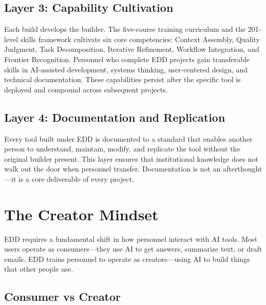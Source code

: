 \documentclass[11pt,letterpaper]{article}
\begin{document}
\subsection{Layer 3: Capability Cultivation}
\label{sec:layer-3}

Each build develops the builder. The five-course training curriculum and the 201-level
skills framework cultivate six core competencies: Context Assembly, Quality Judgment,
Task Decomposition, Iterative Refinement, Workflow Integration, and Frontier Recognition.
Personnel who complete EDD projects gain transferable skills in AI-assisted development,
systems thinking, user-centered design, and technical documentation. These capabilities
persist after the specific tool is deployed and compound across subsequent projects.

\subsection{Layer 4: Documentation and Replication}
\label{sec:layer-4}

Every tool built under EDD is documented to a standard that enables another person to
understand, maintain, modify, and replicate the tool without the original builder present.
This layer ensures that institutional knowledge does not walk out the door when personnel
transfer. Documentation is not an afterthought---it is a core deliverable of every project.

\section{The Creator Mindset}
\label{sec:creator-mindset}

EDD requires a fundamental shift in how personnel interact with AI tools. Most users
operate as consumers---they use AI to get answers, summarize text, or draft emails.
EDD trains personnel to operate as creators---using AI to build things that other
people use.

\subsection{Consumer vs Creator}
\label{sec:consumer-vs-creator}
\end{document}
